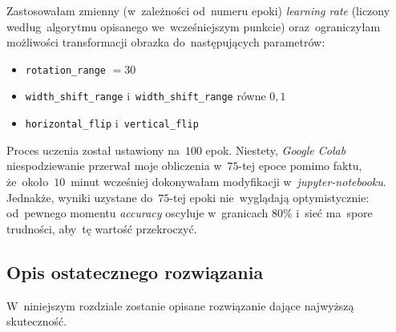 \documentclass[11pt, a4paper]{article}
\begin{document}
Zastosowałam zmienny (w~zależności od~numeru epoki) \textit{learning rate} (liczony według~algorytmu opisanego we~wcześniejszym punkcie) oraz~ograniczyłam możliwości transformacji obrazka do~następujących parametrów:
\begin{itemize}
    \item \texttt{rotation\_range} $=30$
    \item \texttt{width\_shift\_range} i~\texttt{width\_shift\_range} równe $0,1$
    \item \texttt{horizontal\_flip} i~\texttt{vertical\_flip}
\end{itemize}
Proces uczenia został ustawiony na~$100$ epok. Niestety, \textit{Google Colab} niespodziewanie przerwał moje obliczenia w~$75$-tej epoce pomimo faktu, że~około~$10$~minut wcześniej dokonywałam modyfikacji w~\textit{jupyter-notebooku}.
Jednakże, wyniki uzystane do~$75$-tej epoki nie~wyglądają optymistycznie: od~pewnego momentu \textit{accuracy} oscyluje w~granicach $80\%$ i~sieć ma~spore trudności, aby~tę wartość przekroczyć.

\subsection{Opis ostatecznego rozwiązania}
W~niniejszym rozdziale zostanie opisane rozwiązanie dające najwyższą skuteczność.
\end{document}
